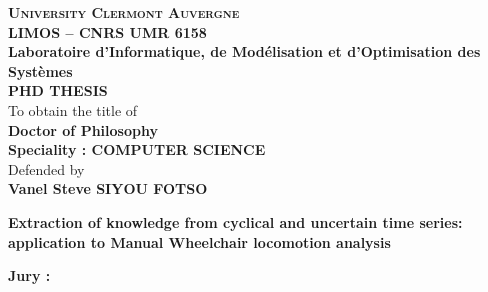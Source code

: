 \begin{titlepage}
\begin{center}
\large{ \textbf{ \textsc{University Clermont Auvergne} } }\\
\large{ \textbf{ \textsc{LIMOS – CNRS UMR 6158}}}\\
\large{ \textbf{Laboratoire d’Informatique, de Modélisation et d’Optimisation des Systèmes}}\\
\large{ \textbf{ \textsc{PHD THESIS}}}\\
To obtain the title of\\
\large{ \textbf{ Doctor of Philosophy}}\\
\large{ \textbf{ Speciality : COMPUTER SCIENCE}}\\
Defended by\\
\large{ \textbf{ Vanel Steve SIYOU FOTSO}}\\

\end{center}
\hrulefill
\begin{center}\bfseries\Huge
    Extraction of knowledge from cyclical and uncertain time series: application to Manual Wheelchair locomotion analysis
\end{center}
\hrulefill
\vspace*{1cm}
    
\begin{center}%
\textbf{ Jury : }\\


\end{center}
\end{titlepage}
